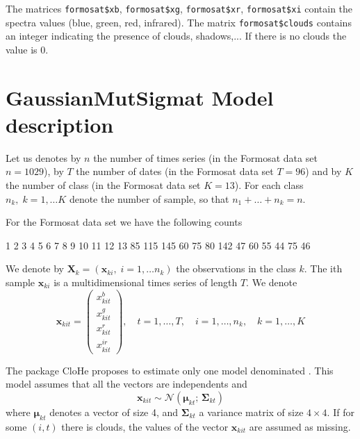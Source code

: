 \documentclass[shortnames,nojss,article]{jss}
\newcommand{\bmu}{\boldsymbol{\mu}}
\newcommand{\bSigma}{\boldsymbol{\Sigma}}
\begin{document}
The matrices \verb+formosat$xb+, \verb+formosat$xg+, \verb+formosat$xr+,
\verb+formosat$xi+ contain the spectra values (blue, green, red, infrared). The matrix
\verb+formosat$clouds+ contains an integer indicating the presence of clouds,
shadows,... If there is no clouds the value is 0.

\section{GaussianMutSigmat Model description}

Let us denotes by $n$ the number of times series (in the Formosat data set
$n=1029$), by $T$ the number of dates (in the Formosat data set $T=96$) and by
$K$ the number of class (in the Formosat data set $K=13$). For each class
$n_k,\;k=1,\ldots K$ denote the number of sample, so that $n_1+\ldots+n_k = n$.

For the Formosat data set we have the following counts

\begin{Schunk}
\begin{Soutput}
  1   2   3   4   5   6   7   8   9  10  11  12  13 
 85 115 145  60  75  80 142  47  60  55  44  75  46 
\end{Soutput}
\end{Schunk}

We denote by $_k = (_{ki},\; i=1,\ldots n_k)$ the
observations in the class $k$. The ith sample $_{ki}$ is a multidimensional
times series of length $T$. We denote
$$
\mathbf{x}_{kit} = \begin{pmatrix}
x_{kit}^{b} \\
x_{kit}^{g} \\
x_{kit}^{r} \\
x_{kit}^{ir}
\end{pmatrix},\quad t=1,\ldots,T,\quad i=1,\ldots,n_k,\quad k=1,\ldots,K
$$

The package CloHe proposes to estimate only one model denominated
. This model assumes that all the vectors are
independents and
$$
\mathbf{x}_{kit} \sim \mathcal{N}\left( \bmu_{kt};\, \bSigma_{kt}  \right)
$$
where $\bmu_{kt}$ denotes a vector of size 4, and $\bSigma_{kt}$ a variance matrix of
size $4$. If for some $(i,t)$ there is clouds, the values of the vector
$_{kit}$ are assumed as missing.
\end{document}

